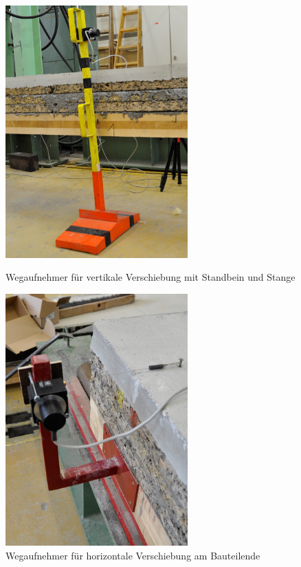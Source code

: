 \begin{figure}[h!]
\begin{minipage}[h!]{7cm}
	\includegraphics[width=7cm]{Versuchsaufbau/d_aufnehmer_unten.jpg}
	\caption{Wegaufnehmer für vertikale Verschiebung mit Standbein und Stange}
	\label{d_aufnehmer_unten}
\end{minipage}
\hfill
\begin{minipage}[h!]{7cm}
	\includegraphics[width=7cm]{Versuchsaufbau/d_aufnehmer_seitlich.jpg}
	\caption{Wegaufnehmer für horizontale Verschiebung am Bauteilende}
	\label{d_aufnehmer_seitlich}
\end{minipage}
\end{figure}










